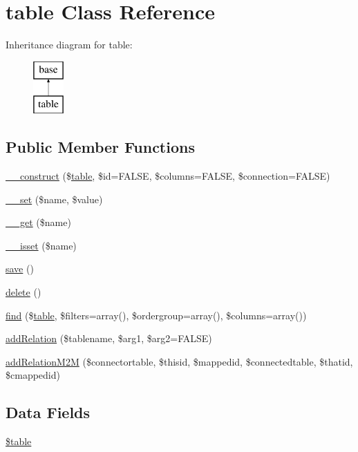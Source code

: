 \hypertarget{classtable}{
\section{table Class Reference}
\label{classtable}
}
Inheritance diagram for table:\begin{figure}[H]
\begin{center}
\leavevmode
\includegraphics[height=2.000000cm]{classtable}
\end{center}
\end{figure}
\subsection*{Public Member Functions}
\begin{DoxyCompactItemize}
\item 
\hyperlink{classtable_adb8d24f1376e0b2c5f31deb281c76385}{\_\-\_\-construct} (\$\hyperlink{classtable}{table}, \$id=FALSE, \$columns=FALSE, \$connection=FALSE)
\item 
\hyperlink{classtable_a83c2703c91959192f759992ad5640b67}{\_\-\_\-set} (\$name, \$value)
\item 
\hyperlink{classtable_abc8e9e31bb15c8a44c3210ec551407c8}{\_\-\_\-get} (\$name)
\item 
\hyperlink{classtable_a8f132f051b7cd7d570ccb9f6e2bb4201}{\_\-\_\-isset} (\$name)
\item 
\hyperlink{classtable_afc8a3c62679cf00ade9f15fb2a6d6132}{save} ()
\item 
\hyperlink{classtable_a13bdffdd926f26b825ea57066334ff01}{delete} ()
\item 
\hyperlink{classtable_a144f2a49e9970315392c13525d5de652}{find} (\$\hyperlink{classtable}{table}, \$filters=array(), \$ordergroup=array(), \$columns=array())
\item 
\hyperlink{classtable_aa86daa58bc1ff877f2137c27b222dff6}{addRelation} (\$tablename, \$arg1, \$arg2=FALSE)
\item 
\hyperlink{classtable_a29c2012e7cc6b182cc3ca63acfc324b9}{addRelationM2M} (\$connectortable, \$thisid, \$mappedid, \$connectedtable, \$thatid, \$cmappedid)
\end{DoxyCompactItemize}
\subsection*{Data Fields}
\begin{DoxyCompactItemize}
\item 
\hyperlink{classtable_ae8876a14058f368335baccf35af4a22b}{\$table}
\end{DoxyCompactItemize}

